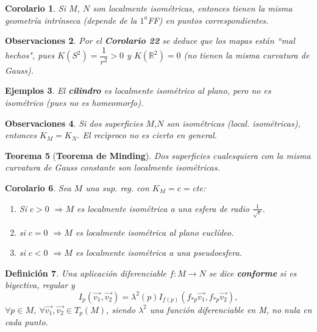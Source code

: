 \documentclass[ebook,oneside]{memoir}
\newtheorem{thm}{Teorema}[chapter]
\newtheorem{coro}[thm]{Corolario}
\newtheorem{defn}[thm]{Definición}
\newtheorem{rem}[thm]{Observaciones}
\newtheorem{eje}[thm]{Ejemplos}
\begin{document}
\begin{coro}
Si  $M$, $N$ son localmente isom\'etricas, entonces tienen la misma geometr\'ia intr\'inseca (depende de la $1^a$FF) en puntos correspondientes.
%
\end{coro}

\begin{rem}
Por el \textbf{Corolario 22} se deduce que los mapas est\'an ``mal hechos", pues $K(S^2)= \dfrac{1}{r^2} >0$ y $K(\mathbb{R}^2)=0$ (no tienen la misma curvatura de Gauss).
\end{rem}

\begin{eje}
El \textbf{cilindro} es localmente isom\'etrico al plano, pero no es isom\'etrico (pues no es homeomorfo).
\end{eje}

\begin{rem}
Si dos superficies $M$,$N$ son isom\'etricas (local. isom\'etricas), entonces $K_M = K_N$.
El rec\'{\i}proco no es cierto en general.
\end{rem}

\begin{thm}[\textbf{Teorema de Minding}]
Dos superficies cualesquiera con la misma curvatura de Gauss constante son localmente isom\'etricas.

\end{thm}

\begin{coro}
Sea $M$ una sup. reg. con $K_M=c=$cte:
\begin{enumerate}
\item Si $c>0$ $\Rightarrow M$ es localmente isom\'etrica a una esfera de radio $\frac{1}{\sqrt{c}}$.

\item si $c=0$ $\Rightarrow M$ es localmente isom\'etrica al plano eucl\'ideo.

\item si $c<0$ $\Rightarrow M$ es localmente isom\'etrica a una pseudoesfera.

\end{enumerate}
\end{coro}

\begin{defn}
Una aplicaci\'on diferenciable $f: M \longrightarrow N$ se dice \textbf{conforme} si es biyectiva, regular y $$I_p (\overrightarrow{v_1},\overrightarrow{v_2}) = \lambda^2(p)I_{f(p)}(f_{*p}\overrightarrow{v_1},f_{*p}\overrightarrow{v_2}),$$ $\forall p \in M$, $\forall \overrightarrow{v_1},\overrightarrow{v_2} \in T_p(M)$, siendo $\lambda^2$ una funci\'on diferenciable en M, no nula en cada punto.
\end{defn}
\end{document}
